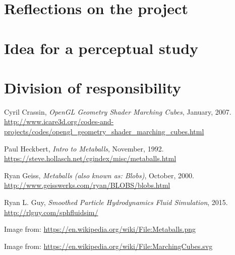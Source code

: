 \documentclass{article}
\begin{document}
\begin{multicols}{2}
    \section{Reflections on the project}

    \section{Idea for a perceptual study}

    \section{Division of responsibility}

	\end{multicols}

\begin{thebibliography}{9}

	Cyril Crassin,
	\textit{OpenGL Geometry Shader Marching Cubes},
	January,
	2007.
	\\
	\url{http://www.icare3d.org/codes-and-projects/codes/opengl_geometry_shader_marching_cubes.html}

	Paul Heckbert,
	\textit{Intro to Metaballs},
	November,
	1992.
	\\
	\url{https://steve.hollasch.net/cgindex/misc/metaballs.html}
	
	Ryan Geiss,
	\textit{Metaballs (also known as: Blobs)},
	October,
	2000.
	\\
	\url{http://www.geisswerks.com/ryan/BLOBS/blobs.html}

	Ryan L. Guy,
	\textit{Smoothed Particle Hydrodynamics Fluid Simulation},
	2015.
	\\
	\url{http://rlguy.com/sphfluidsim/}

	Image from: \url{https://en.wikipedia.org/wiki/File:Metaballs.png}

  Image from: \url{https://en.wikipedia.org/wiki/File:MarchingCubes.svg}

\end{thebibliography}
\end{document}
